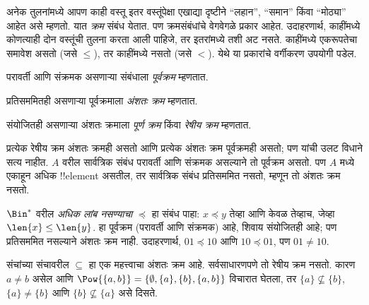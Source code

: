 \documentclass[../../../include/open-logic-section]{subfiles}
\begin{document}

\begin{explain}
अनेक तुलनांमध्ये आपण काही वस्तू इतर वस्तूंपेक्षा एखाद्या दृष्टीने
``लहान'', ``समान'' किंवा ``मोठ्या'' आहेत असे म्हणतो. यात \emph{क्रम}
संबंध येतात. पण क्रमसंबंधांचे वेगवेगळे प्रकार आहेत. उदाहरणार्थ, काहींमध्ये
कोणत्याही दोन वस्तूंची तुलना करता आली पाहिजे, तर इतरांमध्ये तशी अट नसते.
काहींमध्ये एकरूपतेचा समावेश असतो (जसे $\le$), तर काहींमध्ये नसतो
(जसे $<$). येथे या प्रकारांचे वर्गीकरण उपयोगी पडेल.
\end{explain}

\begin{defn}[पूर्वक्रम]
परावर्ती आणि संक्रमक असणाऱ्या संबंधाला \emph{पूर्वक्रम} म्हणतात.
\end{defn}

\begin{defn}[अंशतः क्रम]
प्रतिसममितही असणाऱ्या पूर्वक्रमाला \emph{अंशतः क्रम} म्हणतात.
\end{defn}

\begin{defn}[रेषीय क्रम]
संयोजितही असणाऱ्या अंशतः क्रमाला \emph{पूर्ण क्रम} किंवा \emph{रेषीय क्रम}
म्हणतात.
\end{defn}

\begin{ex}
प्रत्येक रेषीय क्रम अंशतः क्रमही असतो आणि प्रत्येक अंशतः क्रम पूर्वक्रमही
असतो; पण यांची उलट विधाने सत्य नाहीत. $A$ वरील सार्वत्रिक संबंध परावर्ती
आणि संक्रमक असल्याने तो पूर्वक्रम असतो. पण $A$ मध्ये एकाहून अधिक
!!{element} असतील, तर सार्वत्रिक संबंध प्रतिसममित नसतो, म्हणून तो
अंशतः क्रम नसतो.
\end{ex}

\begin{ex}
$\Bin^*$ वरील \emph{अधिक लांब नसण्याचा} $\preccurlyeq$ हा संबंध पाहा:
$x \preccurlyeq y$ तेव्हा आणि केवळ तेव्हाच, जेव्हा $\len{x} \le \len{y}$.
हा पूर्वक्रम (परावर्ती आणि संक्रमक) आहे, शिवाय संयोजितही आहे; पण
प्रतिसममित नसल्याने अंशतः क्रम नाही. उदाहरणार्थ,
$01 \preccurlyeq 10$ आणि $10 \preccurlyeq 01$, पण $01 \neq 10$.
\end{ex}

\begin{ex}
संचांच्या संचावरील $\subseteq$ हा एक महत्त्वाचा अंशतः क्रम आहे.
सर्वसाधारणपणे तो रेषीय क्रम नसतो. कारण $a \neq b$ असेल आणि
$\Pow{\{a, b\}} = \{\emptyset, \{a\}, \{b\}, \{a,b\}\}$ विचारात घेतला,
तर $\{a\} \nsubseteq \{b\}$, $\{a\} \neq \{b\}$ आणि
$\{b\} \nsubseteq \{a\}$ असे दिसते.
\end{ex}
\end{document}
